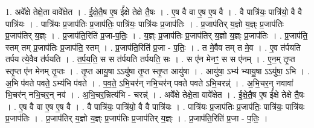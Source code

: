 \documentclass[17pt]{extarticle}
\begin{document}
1. अवे᳚क्षे तेक्षे॒ता वावे᳚क्षेत । . ई॒क्षे॒तै॒ष ए॒ष ई᳚क्षे तेक्षे तै॒षः । . ए॒ष वै वा ए॒ष ए॒ष वै । . वै पात्रि॑यः॒ पात्रि॑यो॒ वै वै पात्रि॑यः । . पात्रि॑यः प्र॒जाप॑तिः प्र॒जाप॑तिः॒ पात्रि॑यः॒ पात्रि॑यः प्र॒जाप॑तिः । . प्र॒जाप॑तिर् य॒ज्ञो य॒ज्ञ्ः प्र॒जाप॑तिः प्र॒जाप॑तिर् य॒ज्ञ्ः । . प्र॒जाप॑ति॒रिति॑ प्र॒जा-प॒तिः॒ । . य॒ज्ञ्ः प्र॒जाप॑तिः प्र॒जाप॑तिर् य॒ज्ञो य॒ज्ञ्ः प्र॒जाप॑तिः । . प्र॒जाप॑ति॒ स्तम् तम् प्र॒जाप॑तिः प्र॒जाप॑ति॒ स्तम् । . प्र॒जाप॑ति॒रिति॑ प्र॒जा - प॒तिः॒ । . त मे॒वैव तम् त मे॒व । . ए॒व त॑र्पयति तर्पय त्ये॒वैव त॑र्पयति । . त॒र्प॒य॒ति॒ स स त॑र्पयति तर्पयति॒ सः । . स ए॑न मेनꣳ॒॒ स स ए॑नम् । . ए॒न॒म् तृ॒प्त स्तृ॒प्त ए॑न मेनम् तृ॒प्तः । . तृ॒प्त आयु॒षा ऽऽयु॑षा तृ॒प्त स्तृ॒प्त आयु॑षा । . आयु॑षा॒ ऽभ्य॑ भ्यायु॒षा ऽऽयु॑षा॒ ऽभि । . अ॒भि प॑वते पवते॒ ऽभ्य॑भि प॑वते । . प॒व॒ते॒ ऽभि॒चर॑न् नभि॒चर॑न् पवते पवते ऽभि॒चरन्न्॑ । . अ॒भि॒चर॒न् नवावा॑ भि॒चर॑न् नभि॒चर॒न् नव॑ । . अ॒भि॒चर॒न्नित्य॑भि - चरन्न्॑ । . अवे᳚क्षे तेक्षे॒ता वावे᳚क्षेत । . ई॒क्षे॒तै॒ष ए॒ष ई᳚क्षे तेक्षे तै॒षः । . ए॒ष वै वा ए॒ष ए॒ष वै । . वै पात्रि॑यः॒ पात्रि॑यो॒ वै वै पात्रि॑यः । . पात्रि॑यः प्र॒जाप॑तिः प्र॒जाप॑तिः॒ पात्रि॑यः॒ पात्रि॑यः प्र॒जाप॑तिः । . प्र॒जाप॑तिर् य॒ज्ञो य॒ज्ञ्ः प्र॒जाप॑तिः प्र॒जाप॑तिर् य॒ज्ञ्ः । . प्र॒जाप॑ति॒रिति॑ प्र॒जा - प॒तिः॒ । \newline
\end{document}
